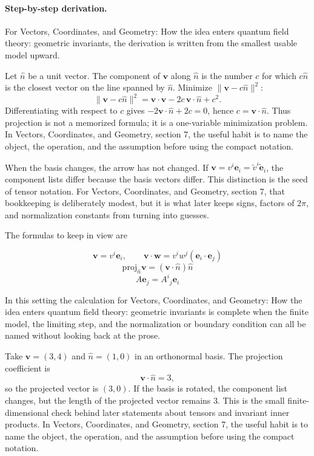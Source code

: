 \paragraph{Step-by-step derivation.}

For Vectors, Coordinates, and Geometry: How the idea enters quantum field theory: geometric invariants, the derivation is written from the smallest usable model upward.

Let \(\hat n\) be a unit vector.  The component of \(\bm v\) along \(\hat n\) is the number \(c\) for which \(c\hat n\) is the closest vector on the line spanned by \(\hat n\).  Minimize \(\|\bm v-c\hat n\|^2\):
\[
  \|\bm v-c\hat n\|^2=\bm v\cdot\bm v-2c\,\bm v\cdot\hat n+c^2.
\]
Differentiating with respect to \(c\) gives \(-2\bm v\cdot\hat n+2c=0\), hence \(c=\bm v\cdot\hat n\).  Thus projection is not a memorized formula; it is a one-variable minimization problem.  In Vectors, Coordinates, and Geometry, section 7, the useful habit is to name the object, the operation, and the assumption before using the compact notation.

When the basis changes, the arrow has not changed.  If \(\bm v=v^i\bm e_i=\tilde v^i\tilde{\bm e}_i\), the component lists differ because the basis vectors differ.  This distinction is the seed of tensor notation.  For Vectors, Coordinates, and Geometry, section 7, that bookkeeping is deliberately modest, but it is what later keeps signs, factors of \(2\pi\), and normalization constants from turning into guesses.

The formulas to keep in view are

\[
  \bm v=v^i\bm e_i,\qquad \bm v\cdot\bm w=v^iw^j(\bm e_i\cdot\bm e_j)
\]
\[
  \mathrm{proj}_{\hat n}\bm v=(\bm v\cdot\hat n)\hat n
\]
\[
  A\bm e_j=A^i{}_j\bm e_i
\]

In this setting the calculation for Vectors, Coordinates, and Geometry: How the idea enters quantum field theory: geometric invariants is complete when the finite model, the limiting step, and the normalization or boundary condition can all be named without looking back at the prose.




\begin{example}
Take \(\bm v=(3,4)\) and \(\hat n=(1,0)\) in an orthonormal basis.  The projection coefficient is
\[
  \bm v\cdot\hat n=3,
\]
so the projected vector is \((3,0)\).  If the basis is rotated, the component list changes, but the length of the projected vector remains \(3\).  This is the small finite-dimensional check behind later statements about tensors and invariant inner products.  In Vectors, Coordinates, and Geometry, section 7, the useful habit is to name the object, the operation, and the assumption before using the compact notation.
\end{example}



